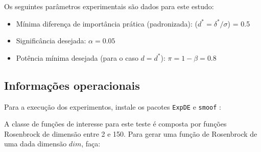 \documentclass[11pt,twoside,printwatermark=false]{pinp}
\providecommand{\tightlist}{%
  \setlength{\itemsep}{0pt}\setlength{\parskip}{0pt}}
\begin{document}
Os seguintes parâmetros experimentais são dados para este estudo:

\begin{itemize}
\tightlist
\item
  Mínima diferença de importância prática (padronizada):
  (\(d^* = \delta^*/\sigma\)) = 0.5
\item
  Significância desejada: \(\alpha = 0.05\)
\item
  Potência mínima desejada (para o caso \(d = d^*\)):
  \(\pi = 1 - \beta = 0.8\)
\end{itemize}

\subsection{Informações operacionais}\label{informacoes-operacionais}

Para a execução dos experimentos, instale os pacotes \texttt{ExpDE}
\citep{Campelo2016} e \texttt{smoof} \citep{smoof}:

\begin{Shaded}
\begin{Highlighting}[]
\NormalTok{(}\NormalTok{)}
\NormalTok{(}\NormalTok{)}
\end{Highlighting}
\end{Shaded}

A classe de funções de interesse para este teste é composta por funções
Rosenbrock \citep{rosenbrock} \citep{Fobjs} de dimensão entre 2 e 150.
Para gerar uma função de Rosenbrock de uma dada dimensão \(dim\), faça:

\begin{Shaded}
\begin{Highlighting}[]
\NormalTok{(}

\StringTok{ }

\StringTok{ }
  \NormalTok{(}\OperatorTok{!}\StringTok{ } \NormalTok{) }

\StringTok{ } \NormalTok{, }
             \OperatorTok{::}\NormalTok{(}
  
\NormalTok{\}}

\StringTok{ }\NormalTok{(}\NormalTok{(}\NormalTok{), } \NormalTok{)}
\end{Highlighting}
\end{Shaded}
\end{document}
